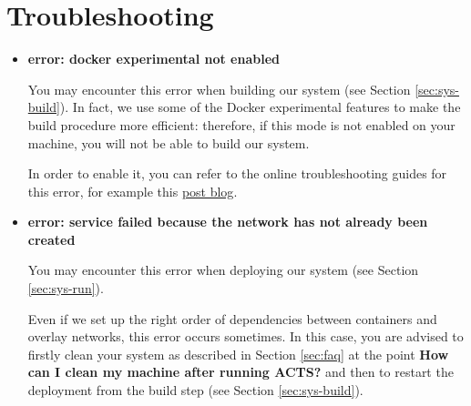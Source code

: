 \section{Troubleshooting}\label{sec:trouble}

\begin{itemize}

\item \textbf{error: docker experimental not enabled}

You may encounter this error when building our system (see Section
\ref{sec:sys-build}).
In fact, we use some of the Docker experimental features to make the build
procedure more efficient: therefore, if this mode is not enabled on your
machine, you will not be able to build our system.

In order to enable it, you can refer to the online troubleshooting guides for
this error, for example this
\href{https://sreeninet.wordpress.com/2017/01/27/docker-1-13-experimental-features/}{post blog}.

\item \textbf{error: service failed because the network has not already been
  created}

You may encounter this error when deploying our system (see Section
\ref{sec:sys-run}).

Even if we set up the right order of dependencies between containers and
overlay networks, this error occurs sometimes.
In this case, you are advised to firstly clean your system as described in
Section \ref{sec:faq} at the point \textbf{How can I clean my machine after
running ACTS?} and then to restart the deployment from the build step (see
Section \ref{sec:sys-build}).


\end{itemize}

